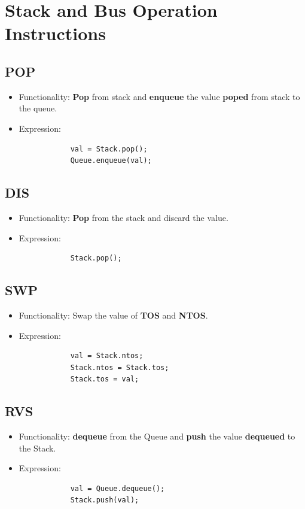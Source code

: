 \documentclass[11pt]{report}
\begin{document}
    \section{Stack and Bus Operation Instructions}
    \subsection{POP}
    \begin{itemize}
        \item Functionality: \textbf{Pop} from stack and
                \textbf{enqueue} the value \textbf{poped} from stack to the queue.
        \item Expression:
        \begin{verbatim}
            val = Stack.pop();
            Queue.enqueue(val);
        \end{verbatim}
    \end{itemize}

    \subsection{DIS}
    \begin{itemize}
        \item Functionality: \textbf{Pop} from the stack and discard the value.
        \item Expression:
        \begin{verbatim}
            Stack.pop();
        \end{verbatim}
    \end{itemize}

    \subsection{SWP}
    \begin{itemize}
        \item Functionality: Swap the value of \textbf{TOS} and \textbf{NTOS}.
        \item Expression:
        \begin{verbatim}
            val = Stack.ntos;
            Stack.ntos = Stack.tos;
            Stack.tos = val;
        \end{verbatim}
    \end{itemize}

    \subsection{RVS}
    \begin{itemize}
        \item Functionality: \textbf{dequeue} from the Queue and \textbf{push} the value 
                    \textbf{dequeued} to the Stack.
        \item Expression:
        \begin{verbatim}
            val = Queue.dequeue();
            Stack.push(val);
        \end{verbatim}
    \end{itemize}
\end{document}
